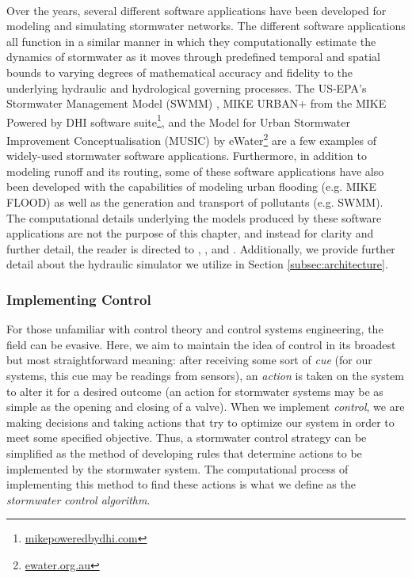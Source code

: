 \

Over the years, several different software applications have been developed for modeling and simulating stormwater networks. The different software applications all function in a similar manner in which they computationally estimate the dynamics of stormwater as it moves through predefined temporal and spatial bounds to varying degrees of mathematical accuracy and fidelity to the underlying hydraulic and hydrological governing processes. The US-EPA's Stormwater Management Model (SWMM) \citep{Rossman2015a}, MIKE URBAN+ from the MIKE Powered by DHI software suite\footnote{\href{https://www.mikepoweredbydhi.com/products/mike-urban-plus}{mikepoweredbydhi.com}}, and the Model for Urban Stormwater Improvement Conceptualisation (MUSIC) by eWater\footnote{\href{https://ewater.org.au/products/music/}{ewater.org.au}} are a few examples of widely-used stormwater software applications. Furthermore, in addition to modeling runoff and its routing, some of these software applications have also been developed with the capabilities of modeling urban flooding (e.g. MIKE FLOOD) as well as the generation and transport of pollutants (e.g. SWMM). The computational details underlying the models produced by these software applications are not the purpose of this chapter, and instead for clarity and further detail, the reader is directed to \citet{Rossman2015b}, \citet{Rossman2017}, and \citet{Rossman2016}. Additionally, we provide further detail about the hydraulic simulator we utilize in Section \ref{subsec:architecture}.
%
%
%
\subsubsection{Implementing Control}
\label{subsec:implementingcontrol}
%
%
%
For those unfamiliar with control theory and control systems engineering, the field can be evasive. Here, we aim to maintain the idea of control in its broadest but most straightforward meaning: after receiving some sort of \emph{cue} (for our systems, this cue may be readings from sensors), an \emph{action} is taken on the system to alter it for a desired outcome (an action for stormwater systems may be as simple as the opening and closing of a valve). When we implement \emph{control}, we are making decisions and taking actions that try to optimize our system in order to meet some specified objective. Thus, a stormwater control strategy can be simplified as the method of developing rules that determine actions to be implemented by the stormwater system. The computational process of implementing this method to find these actions is what we define as the \emph{stormwater control algorithm}.

